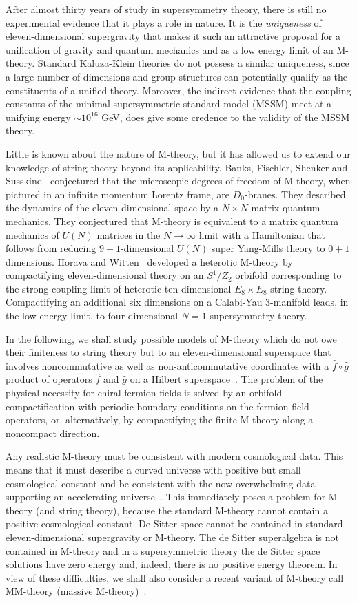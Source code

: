 \documentclass[a4paper,12pt]{article}
\begin{document}
After almost thirty years of study in supersymmetry theory, there is still
no experimental evidence that it plays a role in nature. It is the {\it
uniqueness} of eleven-dimensional supergravity that makes it such an
attractive proposal for a unification of gravity and quantum mechanics and
as a low energy limit of an M-theory. Standard Kaluza-Klein theories do not
possess a similar uniqueness, since a large number of dimensions and group
structures can potentially qualify as the constituents of a unified theory.
Moreover, the indirect evidence that the coupling constants of the minimal
supersymmetric standard model (MSSM) meet at a unifying energy $\sim
10^{16}$ GeV, does give some credence to the validity of the MSSM theory.

Little is known about the nature of M-theory, but it has allowed us to
extend our knowledge of string theory beyond its applicability. Banks,
Fischler, Shenker and Susskind~\cite{Banks} conjectured that the
microscopic degrees of freedom of M-theory, when pictured in an infinite
momentum Lorentz frame, are $D_0$-branes. They described the dynamics of
the eleven-dimensional space by a $N\times N$ matrix quantum mechanics.
They conjectured that M-theory is equivalent to a matrix quantum mechanics
of $U(N)$ matrices in the $N\rightarrow\infty$ limit with a Hamiltonian
that follows from reducing $9+1$-dimensional $U(N)$ super Yang-Mills theory
to $0+1$ dimensions. Horava and Witten~\cite{Horava} developed a heterotic
M-theory by compactifying eleven-dimensional theory on an $S^1/Z_2$
orbifold corresponding to the strong coupling limit of heterotic
ten-dimensional $E_8\times E_8$ string theory. Compactifying an additional
six dimensions on a Calabi-Yau 3-manifold leads, in the low energy limit,
to four-dimensional $N=1$ supersymmetry theory.

In the following, we shall study
possible models of M-theory which do not owe their finiteness to string
theory but to an eleven-dimensional superspace that involves
noncommutative as well as non-anticommutative coordinates with a
${\hat f}\circ {\hat g}$ product of operators ${\hat f}$ and
${\hat g}$ on a Hilbert superspace~\cite{Moffat,Moffat2,Moffat3}. The
problem of the physical necessity for chiral fermion fields is solved by an
orbifold compactification with periodic boundary conditions on the fermion
field operators, or, alternatively, by compactifying the finite M-theory
along a noncompact direction.

Any realistic M-theory must be consistent with modern cosmological data.
This means that it must describe a curved universe with positive but small
cosmological constant and be consistent with the now overwhelming data
supporting an accelerating universe~\cite{Perlmutter}. This immediately
poses a problem for M-theory (and string theory), because the standard
M-theory cannot contain a positive cosmological constant. De Sitter space
cannot be contained in standard eleven-dimensional supergravity or
M-theory. The de Sitter superalgebra is not contained in M-theory and in a
supersymmetric theory the de Sitter space solutions have zero energy and,
indeed, there is no positive energy theorem. In view of these difficulties,
we shall also consider a recent variant of M-theory call MM-theory (massive
M-theory)~\cite{Lambert}.
\end{document}

